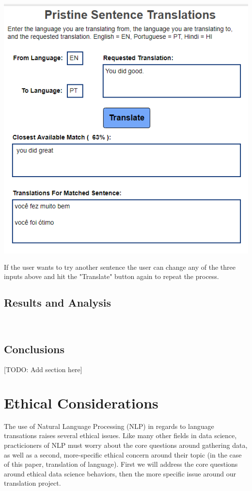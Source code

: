 \documentclass[runningheads]{llncs}
\begin{document}
	\begin{minipage}{\linewidth}
		\begin{center}
			\includegraphics[width=\linewidth]{Screen.png}
			\label{fig:Display Translations}
			\vspace*{1cm}
		\end{center}
	\end{minipage}
	\afterpage{\clearpage}
If the user wants to try another sentence the user can change any of the three inputs above and hit the "Translate" button again to repeat the process.

	\subsection{Results and Analysis}
	
	~\cite{ref_url20}
	
		

	\subsection{Conclusions}
	[TODO: Add section here]

	\section{Ethical Considerations}
	The use of Natural Language Processing (NLP) in regards to language transations raises several ethical issues. Like many other fields in data science, practicioners of NLP must worry about the core questions around gathering data, as well as a second, more-specific ethical concern around their topic (in the case of this paper, translation of language). First we will address the core questions around ethical data science behaviors, then the more specific issue around our translation project.
\end{document}
